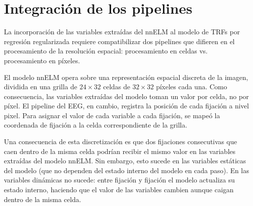 \section{Integración de los pipelines}
\label{sec:celdas_vs_pixeles}


La incorporación de las variables extraídas del nnELM al modelo de TRFs por regresión regularizada requiere compatibilizar dos pipelines que difieren en el procesamiento de la resolución espacial: procesamiento en celdas vs. procesamiento en píxeles.

El modelo nnELM opera sobre una representación espacial discreta de la imagen, dividida en una grilla de $24 \times 32$ celdas de $32 \times 32$ píxeles cada una. Como consecuencia, las variables extraídas del modelo toman un valor por celda, no por píxel. El pipeline del EEG, en cambio, registra la posición de cada fijación a nivel pixel. Para asignar el valor de cada variable a cada fijación, se mapeó la coordenada de fijación a la celda correspondiente de la grilla.

Una consecuencia de esta discretización es que dos fijaciones consecutivas que caen dentro de la misma celda podrían recibir el mismo valor en las variables extraídas del modelo nnELM. Sin embargo, esto sucede en las variables estáticas del modelo (que no dependen del estado interno del modelo en cada paso). En las variables dinámicas no sucede: entre fijación y fijación el modelo actualiza su estado interno, haciendo que el valor de las variables cambien aunque caigan dentro de la misma celda. 


